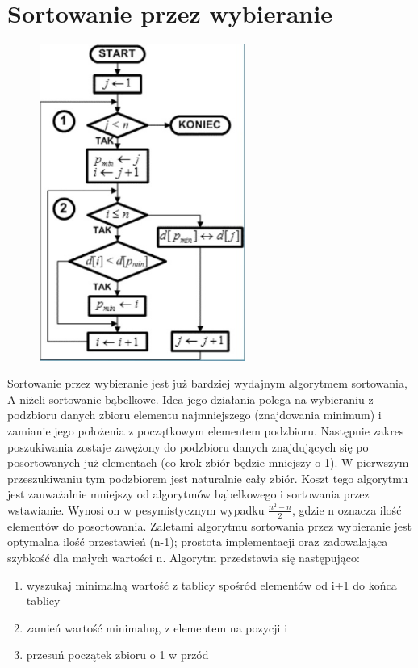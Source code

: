 \documentclass[a4paper,11pt]{article}
\begin{document}
\section{Sortowanie przez wybieranie}
\begin{figure}
\begin{center}
\vspace{-20pt}
\includegraphics[width=0.6\textwidth]{rys13}
\end{center}
\vspace{-20pt}
\vspace{-10pt}
\end{figure}
Sortowanie przez wybieranie jest już bardziej wydajnym 
algorytmem sortowania, A niżeli sortowanie bąbelkowe. Idea 
jego działania polega na wybieraniu z podzbioru danych zbioru 
elementu najmniejszego (znajdowania minimum) i zamianie 
jego położenia z początkowym elementem podzbioru. 
Następnie zakres poszukiwania zostaje zawężony do 
podzbioru danych znajdujących się po posortowanych już 
elementach (co krok zbiór będzie mniejszy o 1). W pierwszym 
przeszukiwaniu tym podzbiorem jest naturalnie cały zbiór. 
Koszt tego algorytmu jest zauważalnie mniejszy od 
algorytmów bąbelkowego i sortowania przez wstawianie. 
Wynosi on w pesymistycznym wypadku \begin{math}
\frac{n^{2}-n}{2}
\end{math}, gdzie n 
oznacza ilość elementów do posortowania. Zaletami 
algorytmu sortowania przez wybieranie jest optymalna ilość 
przestawień (n-1); prostota implementacji oraz zadowalająca 
szybkość dla małych wartości n. 
Algorytm przedstawia się następująco:
\begin{enumerate}
\item wyszukaj minimalną wartość z tablicy spośród elementów 
od i+1 do końca tablicy 
\item zamień wartość minimalną, z elementem na pozycji i 
\item przesuń początek zbioru o 1 w przód 
\end{enumerate}
\newpage
\end{document}
